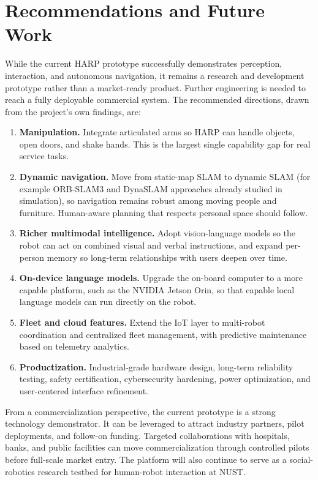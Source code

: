 \documentclass[11pt,a4paper]{article}
\begin{document}
\section{Recommendations and Future Work}

While the current HARP prototype successfully demonstrates perception, interaction, and autonomous navigation, it remains a research and development prototype rather than a market-ready product. Further engineering is needed to reach a fully deployable commercial system. The recommended directions, drawn from the project's own findings, are:

\begin{enumerate}
\item \textbf{Manipulation.} Integrate articulated arms so HARP can handle objects, open doors, and shake hands. This is the largest single capability gap for real service tasks.
\item \textbf{Dynamic navigation.} Move from static-map SLAM to dynamic SLAM (for example ORB-SLAM3 and DynaSLAM approaches already studied in simulation), so navigation remains robust among moving people and furniture. Human-aware planning that respects personal space should follow.
\item \textbf{Richer multimodal intelligence.} Adopt vision-language models so the robot can act on combined visual and verbal instructions, and expand per-person memory so long-term relationships with users deepen over time.
\item \textbf{On-device language models.} Upgrade the on-board computer to a more capable platform, such as the NVIDIA Jetson Orin, so that capable local language models can run directly on the robot.
\item \textbf{Fleet and cloud features.} Extend the IoT layer to multi-robot coordination and centralized fleet management, with predictive maintenance based on telemetry analytics.
\item \textbf{Productization.} Industrial-grade hardware design, long-term reliability testing, safety certification, cybersecurity hardening, power optimization, and user-centered interface refinement.
\end{enumerate}

From a commercialization perspective, the current prototype is a strong technology demonstrator. It can be leveraged to attract industry partners, pilot deployments, and follow-on funding. Targeted collaborations with hospitals, banks, and public facilities can move commercialization through controlled pilots before full-scale market entry. The platform will also continue to serve as a social-robotics research testbed for human-robot interaction at NUST.
\end{document}
